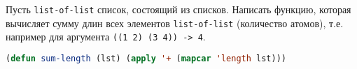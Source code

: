 Пусть \verb|list-of-list| список, состоящий из списков. Написать функцию, которая
вычисляет сумму длин всех элементов \verb|list-of-list| (количество атомов), т.е. например
для аргумента \verb|((1 2) (3 4)) -> 4|.

\begin{lstlisting}[language=Lisp]
(defun sum-length (lst) (apply '+ (mapcar 'length lst)))
\end{lstlisting}

